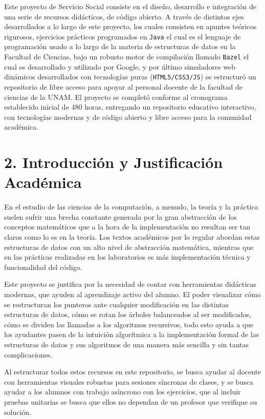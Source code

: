 \documentclass[12 pt]{article}
\begin{document}
Este proyecto de Servicio Social consiste en el diseño, desarrollo e integración de una serie de recursos didácticos, de código abierto. A través de distintos ejes desarrollados a lo largo de este proyecto, los cuales consisten en apuntes teóricos rigurosos, ejercicios prácticos programados en \texttt{Java} el cual es el lenguaje de programación usado a lo largo de la materia de estructuras de datos en la Facultad de Ciencias, bajo un robusto motor de compilación llamado \texttt{Bazel} el cual es desarrollado y utilizado por Google, y por último simuladores web dinámicos desarrollados con tecnologías puras (\texttt{HTML5/CSS3/JS}) se estructuró un repositorio de libre acceso para apoyar al personal docente de la facultad de ciencias de la UNAM. El proyecto se completó conforme al cronograma establecido inicial de 480 horas, entregando un repositorio educativo interactivo, con tecnologías modernas y de código abierto y libre acceso para la comunidad académica.

\section*{2. Introducción y Justificación Académica}

En el estudio de las ciencias de la computación, a menudo, la teoría y la práctica suelen sufrir una brecha constante generada por la gran abstracción de los conceptos matemáticos que a la hora de la implementación no resultan ser tan claros como lo es en la teoría. Los textos académicos por lo regular abordan estas estructuras de datos con un alto nivel de abstracción matemática, mientras que en las prácticas realizadas en los laboratorios es más implementación técnica y funcionalidad del código.

Este proyecto se justifica por la necesidad de contar con herramientas didácticas modernas, que ayuden al aprendizaje activo del alumno. El poder visualizar cómo se restructuran los punteros ante cualquier modificación en las distintas estructuras de datos, cómo se rotan los árboles balanceados al ser modificados, cómo se dividen las llamadas a los algoritmos recursivos, todo esto ayuda a que los ayudantes pasen de la intuición algorítmica a la implementación formal de las estructuras de datos y sus algoritmos de una manera más sencilla y sin tantas complicaciones.

Al estructurar todos estos recursos en este repositorio, se busca ayudar al docente con herramientas visuales robustas para sesiones síncronas de clases, y se busca ayudar a los alumnos con trabajo asíncrono con los ejercicios, que al incluir pruebas unitarias se busca que ellos no dependan de un profesor que verifique su solución.
\end{document}
